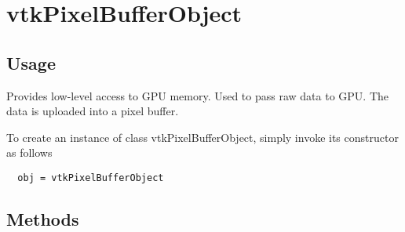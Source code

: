 \section{vtkPixelBufferObject}

\subsection{Usage}

 Provides low-level access to GPU memory. Used to pass raw data to GPU. 
 The data is uploaded into a pixel buffer.

To create an instance of class vtkPixelBufferObject, simply
invoke its constructor as follows
\begin{verbatim}
  obj = vtkPixelBufferObject
\end{verbatim}
\subsection{Methods}

